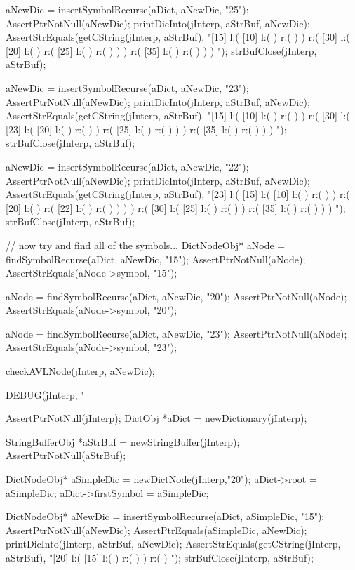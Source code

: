   aNewDic = insertSymbolRecurse(aDict, aNewDic, "25");
  AssertPtrNotNull(aNewDic);
  printDicInto(jInterp, aStrBuf, aNewDic);
  AssertStrEquals(getCString(jInterp, aStrBuf),
  "[15] l:( [10] l:(  ) r:(  )  ) r:( [30] l:( [20] l:(  ) r:( [25] l:(  ) r:(  )  )  ) r:( [35] l:(  ) r:(  )  )  ) ");
  strBufClose(jInterp, aStrBuf);

  aNewDic = insertSymbolRecurse(aDict, aNewDic, "23");
  AssertPtrNotNull(aNewDic);
  printDicInto(jInterp, aStrBuf, aNewDic);
  AssertStrEquals(getCString(jInterp, aStrBuf),
  "[15] l:( [10] l:(  ) r:(  )  ) r:( [30] l:( [23] l:( [20] l:(  ) r:(  )  ) r:( [25] l:(  ) r:(  )  )  ) r:( [35] l:(  ) r:(  )  )  ) ");
  strBufClose(jInterp, aStrBuf);
  
  aNewDic = insertSymbolRecurse(aDict, aNewDic, "22");
  AssertPtrNotNull(aNewDic);
  printDicInto(jInterp, aStrBuf, aNewDic);
  AssertStrEquals(getCString(jInterp, aStrBuf),
  "[23] l:( [15] l:( [10] l:(  ) r:(  )  ) r:( [20] l:(  ) r:( [22] l:(  ) r:(  )  )  )  ) r:( [30] l:( [25] l:(  ) r:(  )  ) r:( [35] l:(  ) r:(  )  )  ) ");
  strBufClose(jInterp, aStrBuf);
  
  // now try and find all of the symbols...
  DictNodeObj* aNode = findSymbolRecurse(aDict, aNewDic, "15");
  AssertPtrNotNull(aNode);
  AssertStrEquals(aNode->symbol, "15");

  aNode = findSymbolRecurse(aDict, aNewDic, "20");
  AssertPtrNotNull(aNode);
  AssertStrEquals(aNode->symbol, "20");

  aNode = findSymbolRecurse(aDict, aNewDic, "23");
  AssertPtrNotNull(aNode);
  AssertStrEquals(aNode->symbol, "23");

  checkAVLNode(jInterp, aNewDic);
\stopCTest
\stopTestCase


\startCTest
  DEBUG(jInterp, "\n%

  AssertPtrNotNull(jInterp);
  DictObj *aDict = newDictionary(jInterp);

  StringBufferObj *aStrBuf = newStringBuffer(jInterp);
  AssertPtrNotNull(aStrBuf);
  
  DictNodeObj* aSimpleDic = newDictNode(jInterp,"20");
  aDict->root             = aSimpleDic;
  aDict->firstSymbol      = aSimpleDic;

  DictNodeObj* aNewDic = insertSymbolRecurse(aDict, aSimpleDic, "15");
  AssertPtrNotNull(aNewDic);
  AssertPtrEquals(aSimpleDic, aNewDic);
  printDicInto(jInterp, aStrBuf, aNewDic);
  AssertStrEquals(getCString(jInterp, aStrBuf),
  "[20] l:( [15] l:(  ) r:(  )  ) r:(  ) ");
  strBufClose(jInterp, aStrBuf);
  
